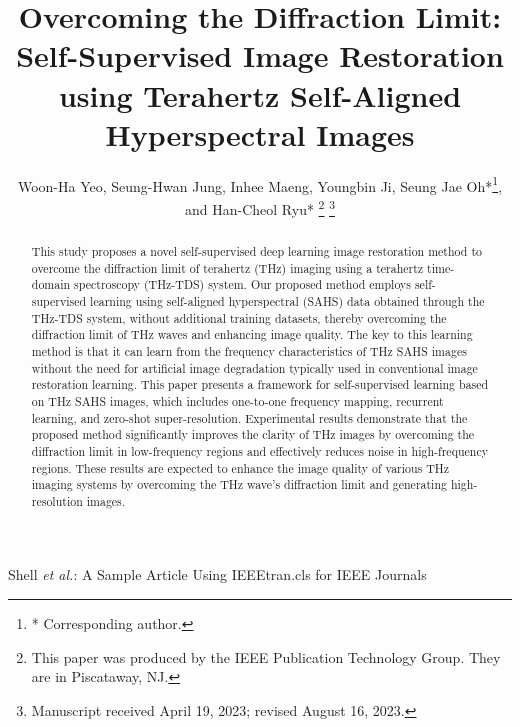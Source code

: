 \documentclass[lettersize,journal]{IEEEtran}
\begin{document}
\title{Overcoming the Diffraction Limit: Self-Supervised Image Restoration using Terahertz Self-Aligned Hyperspectral Images}

\author{Woon-Ha Yeo, Seung-Hwan Jung, Inhee Maeng, Youngbin Ji, Seung Jae Oh*\thanks{* Corresponding author.}, and Han-Cheol Ryu*
\thanks{This paper was produced by the IEEE Publication Technology Group. They are in Piscataway, NJ.}%
\thanks{Manuscript received April 19, 2023; revised August 16, 2023.}}

%
{Shell \MakeLowercase{\textit{et al.}}: A Sample Article Using IEEEtran.cls for IEEE Journals}


\maketitle

\begin{abstract}
This study proposes a novel self-supervised deep learning image restoration method to overcome the diffraction limit of terahertz (THz) imaging using a terahertz time-domain spectroscopy (THz-TDS) system. Our proposed method employs self-supervised learning using self-aligned hyperspectral (SAHS) data obtained through the THz-TDS system, without additional training datasets, thereby overcoming the diffraction limit of THz waves and enhancing image quality. The key to this learning method is that it can learn from the frequency characteristics of THz SAHS images without the need for artificial image degradation typically used in conventional image restoration learning. This paper presents a framework for self-supervised learning based on THz SAHS images, which includes one-to-one frequency mapping, recurrent learning, and zero-shot super-resolution. Experimental results demonstrate that the proposed method significantly improves the clarity of THz images by overcoming the diffraction limit in low-frequency regions and effectively reduces noise in high-frequency regions. These results are expected to enhance the image quality of various THz imaging systems by overcoming the THz wave’s diffraction limit and generating high-resolution images.
\end{abstract}
\end{document}
